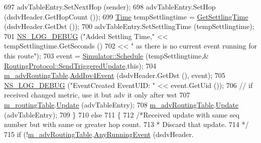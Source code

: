 \begin{DoxyCode}
697                       advTableEntry.SetNextHop (sender);
698                       advTableEntry.SetHop (dsdvHeader.GetHopCount ());
699                       \hyperlink{namespacens3_1_1TracedValueCallback_a7ffd3e7c142ffe7c8a1d2db9b8de38ec}{Time} tempSettlingtime = \hyperlink{classns3_1_1dsdv_1_1RoutingProtocol_a83244927636fd12b775ebdbe0b334e68}{GetSettlingTime} (dsdvHeader.GetDst ());
700                       advTableEntry.SetSettlingTime (tempSettlingtime);
701                       \hyperlink{group__logging_ga413f1886406d49f59a6a0a89b77b4d0a}{NS\_LOG\_DEBUG} (\textcolor{stringliteral}{"Added Settling Time,"} << tempSettlingtime.GetSeconds ()
702                                                            << \textcolor{stringliteral}{" as there is no current event running for
       this route"});
703                       \textcolor{keyword}{event} = \hyperlink{classns3_1_1Simulator_a671882c894a08af4a5e91181bf1eec13}{Simulator::Schedule} (tempSettlingtime,&
      \hyperlink{classns3_1_1dsdv_1_1RoutingProtocol_adc414310ddaa5e69520a176c0dac59cc}{RoutingProtocol::SendTriggeredUpdate},\textcolor{keyword}{this});
704                       \hyperlink{classns3_1_1dsdv_1_1RoutingProtocol_adce3cf63777d6099e58caa1cb198282c}{m\_advRoutingTable}.\hyperlink{classns3_1_1dsdv_1_1RoutingTable_aa9757950491f7aba7c1db83b2d62df67}{AddIpv4Event} (dsdvHeader.GetDst (),
      event);
705                       \hyperlink{group__logging_ga413f1886406d49f59a6a0a89b77b4d0a}{NS\_LOG\_DEBUG} (\textcolor{stringliteral}{"EventCreated EventUID: "} << event.GetUid ());
706                       \textcolor{comment}{// if received changed metric, use it but adv it only after wst}
707                       \hyperlink{classns3_1_1dsdv_1_1RoutingProtocol_acc4cee466c2591e35f508ce58097a00e}{m\_routingTable}.\hyperlink{classns3_1_1dsdv_1_1RoutingTable_a651762730975f809c720313b1332cb99}{Update} (advTableEntry);
708                       \hyperlink{classns3_1_1dsdv_1_1RoutingProtocol_adce3cf63777d6099e58caa1cb198282c}{m\_advRoutingTable}.\hyperlink{classns3_1_1dsdv_1_1RoutingTable_a651762730975f809c720313b1332cb99}{Update} (advTableEntry);
709                     \}
710                   \textcolor{keywordflow}{else}
711                     \{
712                       \textcolor{comment}{/*Received update with same seq number but with same or greater hop count.}
713 \textcolor{comment}{                       * Discard that update.}
714 \textcolor{comment}{                       */}
715                       \textcolor{keywordflow}{if} (!\hyperlink{classns3_1_1dsdv_1_1RoutingProtocol_adce3cf63777d6099e58caa1cb198282c}{m\_advRoutingTable}.\hyperlink{classns3_1_1dsdv_1_1RoutingTable_acb9f117332351347f8345d4591991e6b}{AnyRunningEvent} (dsdvHeader.

\end{DoxyCode}
